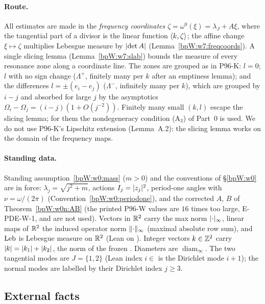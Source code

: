 \paragraph{Route.} All estimates are made in the \emph{frequency coordinates} $\zeta=\omega^0(\xi)=\lambda_J+A\xi$,
where the tangential part of a divisor is the linear function $\langle k,\zeta\rangle$; the affine change $\xi\mapsto\zeta$
multiplies Lebesgue measure by $\lvert \det A\rvert$ (Lemma~\ref{bpW:w7:freqcoords}). A single slicing lemma
(Lemma~\ref{bpW:w7:slab}) bounds the measure of every resonance zone along a coordinate line. The zones are grouped
as in P96-K: $l=0$; $l$ with no sign change ($\Lambda^+$, finitely many per $k$ after an emptiness lemma); and the
differences $l=\pm(e_i-e_j)$ ($\Lambda^-$, infinitely many per $k$), which are grouped by $i-j$ and absorbed for large
$j$ by the asymptotics $\Omega_i-\Omega_j=(i-j)(1+O(j^{-2}))$. Finitely many small $(k,l)$ escape the slicing lemma;
for them the nondegeneracy condition (A$_3$) of Part~0 is used. We do not use P96-K's Lipschitz extension (Lemma~A.2):
the slicing lemma works on the domain of the frequency maps.

\paragraph{Standing data.} Standing assumption~\ref{bpW:w0:mass} ($m>0$) and the conventions of \S\ref{bpW:w0} are
in force: $\lambda_j=\sqrt{j^2+m}$, actions $I_j=\lvert z_j\rvert^2$, period-one angles with $\nu=\omega/(2\pi)$
(Convention~\ref{bpW:w0:periodone}), and the corrected $A$, $B$ of Theorem~\ref{bpW:w0n:AB} (the printed P96-W
values are $16$ times too large, E-PDE-W-1, and are not used). Vectors in $\mathbb{R}^2$ carry the max norm
$\lvert \cdot\rvert_\infty$, linear maps of $\mathbb{R}^2$ the induced operator norm $\lVert \cdot\rVert_\infty$ (maximal absolute row sum),
and $\operatorname{Leb}$ is Lebesgue measure on $\mathbb{R}^2$ (Lean  on ). Integer vectors
$k\in\mathbb{Z}^2$ carry $\lvert k\rvert=\lvert k_1\rvert+\lvert k_2\rvert$, the norm of the frozen . Diameters are
$\operatorname{diam}_\infty$. The two tangential modes are $J=\{1,2\}$ (Lean index $i\in$  is the Dirichlet
mode $i+1$); the normal modes are labelled by their Dirichlet index $j\ge3$.

\subsection{External facts}\label{bpW:w7:ext}

